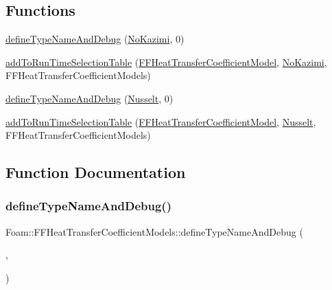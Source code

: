 \subsection*{Functions}
\begin{DoxyCompactItemize}
\item 
\hyperlink{namespaceFoam_1_1FFHeatTransferCoefficientModels_a0700aa0c51b50cceae2106d1d1d83202}{define\+Type\+Name\+And\+Debug} (\hyperlink{classFoam_1_1FFHeatTransferCoefficientModels_1_1NoKazimi}{No\+Kazimi}, 0)
\item 
\hyperlink{namespaceFoam_1_1FFHeatTransferCoefficientModels_a9ad4a32543174c8477a2a1c4aeb65c5e}{add\+To\+Run\+Time\+Selection\+Table} (\hyperlink{classFoam_1_1FFHeatTransferCoefficientModel}{F\+F\+Heat\+Transfer\+Coefficient\+Model}, \hyperlink{classFoam_1_1FFHeatTransferCoefficientModels_1_1NoKazimi}{No\+Kazimi}, F\+F\+Heat\+Transfer\+Coefficient\+Models)
\item 
\hyperlink{namespaceFoam_1_1FFHeatTransferCoefficientModels_aba3a1566a88aa26b7de2b84a941d094f}{define\+Type\+Name\+And\+Debug} (\hyperlink{classFoam_1_1FFHeatTransferCoefficientModels_1_1Nusselt}{Nusselt}, 0)
\item 
\hyperlink{namespaceFoam_1_1FFHeatTransferCoefficientModels_abc6068ca6e6c49772b592f35a0ec243a}{add\+To\+Run\+Time\+Selection\+Table} (\hyperlink{classFoam_1_1FFHeatTransferCoefficientModel}{F\+F\+Heat\+Transfer\+Coefficient\+Model}, \hyperlink{classFoam_1_1FFHeatTransferCoefficientModels_1_1Nusselt}{Nusselt}, F\+F\+Heat\+Transfer\+Coefficient\+Models)
\end{DoxyCompactItemize}


\subsection{Function Documentation}
\mbox{\label{namespaceFoam_1_1FFHeatTransferCoefficientModels_a0700aa0c51b50cceae2106d1d1d83202}} 
\subsubsection{\texorpdfstring{define\+Type\+Name\+And\+Debug()}{defineTypeNameAndDebug()}\hspace{0.1cm}{\footnotesize\ttfamily [1/2]}}
{\footnotesize\ttfamily Foam\+::\+F\+F\+Heat\+Transfer\+Coefficient\+Models\+::define\+Type\+Name\+And\+Debug (\begin{DoxyParamCaption}\item[{\hyperlink{classFoam_1_1FFHeatTransferCoefficientModels_1_1NoKazimi}{No\+Kazimi}}]{,  }\item[{0}]{ }\end{DoxyParamCaption})}

